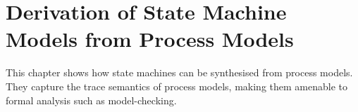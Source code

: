 \chapter{Derivation of State Machine Models from Process Models\label{chapter:deductive}}

This chapter shows how state machines can be synthesised from process models. They capture the trace semantics of process models, making them amenable to formal analysis such as model-checking.






